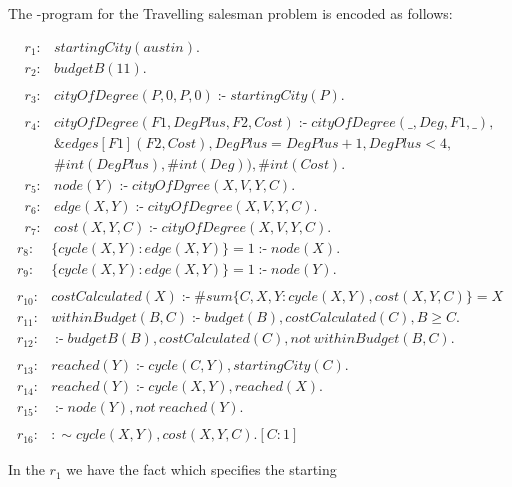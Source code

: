 \documentclass[14pt,a4paper, titlepage]{article}
\newcommand{\ext}[3]{\ensuremath{\&{#1}[#2](#3)}}
\DeclareMathOperator{\leftimpl}{:-}
\begin{document}
The \hex{}-program for the Travelling salesman problem is 
encoded as follows:
\begin{exmp}
\label{travellingSalesman}
\begin{align*}
r_1\colon & startingCity(austin).\\
r_2\colon & budgetB(11).\\
\\
r_3\colon & \mathit{cityOfDegree(P,0,P,0)} \leftimpl 
\mathit{startingCity(P).} \\
& \\
r_4\colon & \mathit{cityOfDegree(F1, DegPlus, F2, Cost)} 
\leftimpl \mathit{cityOfDegree(\_, Deg, F1, \_)}, \\ 
&\ext{edges}{F1}{F2, Cost}, \mathit{DegPlus=DegPlus+1}, 
DegPlus < 4, \\ & \#int(DegPlus), \#int(Deg)), \#int(Cost). 
\\
r_5\colon& \mathit{node(Y)} \leftimpl 
\mathit{cityOfDgree(X, V, Y, C)}.\\
r_6\colon& \mathit{edge}(X, Y) \leftimpl 
\mathit{cityOfDegree(X, V, Y, C).} \\
r_7\colon & cost(X,Y,C) \leftimpl cityOfDegree(X, V, Y, C). 
\end{align*}
\begin{align*}
r_8 \colon & \{ cycle(X,Y) : edge(X,Y) \} = 1 \leftimpl 
node(X). \\
r_{9} \colon &  \{ cycle(X,Y) : edge(X,Y) \} = 1 \leftimpl 
node(Y). \\
& \\
r_{10} \colon & costCalculated(X) \leftimpl \#sum \{C,X,Y : 
cycle(X,Y), cost(X,Y,C)\} = X \\
r_{11} \colon & withinBudget(B,C) \leftimpl budget(B), 
costCalculated(C), B \geq C. \\
r_{12} \colon & \leftimpl  budgetB(B), costCalculated(C), 
\mathit{not} \ \mathit{withinBudget(B,C).} \\
& \\
r_{13} \colon & reached(Y) \leftimpl cycle(C, Y), startingCity(C). \\
r_{14} \colon & reached(Y) \leftimpl cycle(X,Y), 
reached(X). \\
r_{15} \colon & \leftimpl node(Y), \mathit{not} \ 
\mathit{reached(Y)}. \\
& \\
r_{16} \colon & :\sim cycle(X,Y), cost(X,Y,C). [C:1] 
\end{align*}
\end{exmp}
In the $r_1$ we have the fact which specifies the starting 
\end{document}
